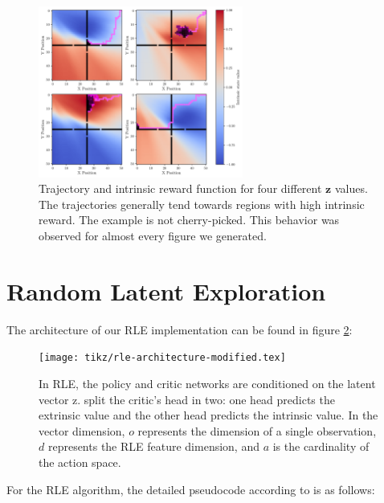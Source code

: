 \begin{figure}[h!]
  \centering
  \includegraphics[width=0.6\textwidth]{figures/gridworld_value_function_trajectory.pdf}
  \caption{Trajectory and intrinsic reward function for four different $\textbf{z}$ values. The trajectories generally tend towards regions with high intrinsic reward. The example is not cherry-picked. This behavior was observed for almost every figure we generated.}
  \label{fig:gridworld-value-function-trajectories}
\end{figure}


\section{Random Latent Exploration}

\noindent The architecture of our RLE implementation can be found in figure \ref{fig:rle-architecture}:

\begin{figure}[h!]
  \centering
  \texttt{[image: tikz/rle-architecture-modified.tex]}
  \caption{In RLE, the policy and critic networks are conditioned on the latent vector z. \cite{rle-paper} split the critic's head in two: one head predicts the extrinsic value and the other head predicts the intrinsic value. In the vector dimension, $o$ represents the dimension of a single observation, $d$ represents the RLE feature dimension, and $a$ is the cardinality of the action space.}
  \label{fig:rle-architecture}
\end{figure}

\noindent For the RLE algorithm, the detailed pseudocode according to \cite{rle-paper} is as follows:

